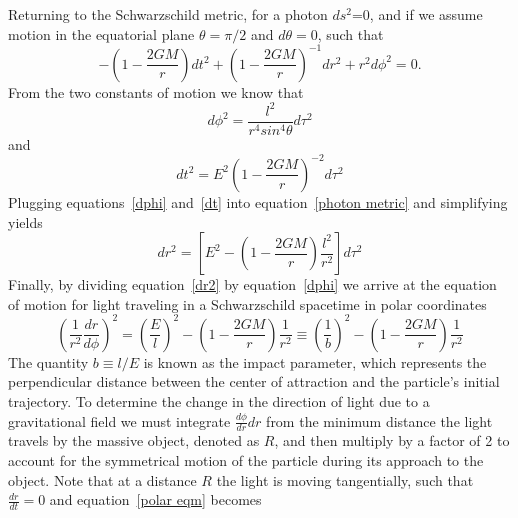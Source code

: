 Returning to the Schwarzschild metric, for a photon $ds^2$=0, and if we assume motion in the equatorial plane $\theta=\pi/2$ and $d \theta =0$, such that
\begin{equation} \label{photon metric}
-\left(1-\frac{2GM}{r} \right)dt^2 + \left(1-\frac{2GM}{r} \right)^{-1}dr^2+r^2 d\phi^2=0.
\end{equation}
From the two constants of motion we know that
\begin{equation} \label{dphi}
d\phi^2=\frac{l^2}{r^4 sin^4 \theta} d\tau^2
\end{equation}
and
\begin{equation} \label{dt}
dt^2=E^2\left(1-\frac{2GM}{r}\right)^{-2}d\tau^2
\end{equation}
Plugging equations~\ref{dphi} and~\ref{dt} into equation~\ref{photon metric} and simplifying yields
\begin{equation} \label{dr2}
dr^2= \left[E^2 - \left(1-\frac{2GM}{r}\right) \frac{l^2}{r^2}\right]d\tau^2
\end{equation} 
Finally, by dividing equation~\ref{dr2} by equation~\ref{dphi} we arrive at the equation of motion for light traveling in a Schwarzschild spacetime in polar coordinates
\begin{equation} \label{polar eqm}
\left(\frac{1}{r^2} \frac{dr}{d \phi} \right)^2 = \left(\frac{E}{l} \right)^2 - \left(1-\frac{2GM}{r}\right)\frac{1}{r^2} \equiv \left(\frac{1}{b}\right)^2 - \left(1-\frac{2GM}{r}\right)\frac{1}{r^2}
\end{equation}
The quantity $b \equiv l/E$ is known as the impact parameter, which represents the perpendicular distance between the center of attraction and the particle's initial trajectory.  To determine the change in the direction of light due to a gravitational field we must integrate $\frac{d\phi}{dr}dr $ from the minimum distance the light travels by the massive object, denoted as $R$, and then multiply by a factor of 2 to account for the symmetrical motion of the particle during its approach to the object. Note that at a distance $R$ the light is moving tangentially, such that $\frac{dr}{dt}=0$ and equation~\ref{polar eqm} becomes
